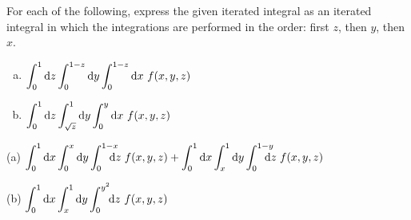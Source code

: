 \begin{question}
For each of the following, express the given iterated integral as an
iterated integral in which the integrations are  performed in the order:
first $z$, then $y$, then $x$.
\begin{enumerate}[(a)]
\item
$\displaystyle\int_0^1\mathrm{d}z\int_0^{1-z}\mathrm{d}y\int_0^{1-z} \mathrm{d}x\ f(x,y,z)$
\item
$\displaystyle\int_0^1\mathrm{d}z\int_{\sqrt z}^1\mathrm{d}y\int_0^y \mathrm{d}x\ f(x,y,z)$
\end{enumerate}
\end{question}

%

\begin{answer}
(a) $\dst\int_0^1\dee{x}\int_0^{x}\dee{y}\int_0^{1-x}\hskip-10pt \dee{z}\hskip3pt f(x,y,z)
+\int_0^1\dee{x}\int_x^{1}\dee{y}\int_0^{1-y}\hskip-10pt \dee{z}\hskip3pt f(x,y,z)$

(b) $\displaystyle\int_0^1\mathrm{d}x\int_x^{1}\mathrm{d}y\int_0^{y^2}\!\! \mathrm{d}z\  f(x,y,z)$
\end{answer}

